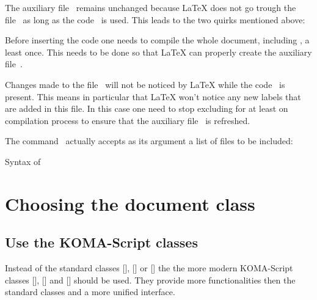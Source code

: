 The auxiliary file~ remains unchanged because {\LaTeX} does not go trough the file~ as long as the code~ is used.
This leads to the two quirks mentioned above:
\begin{myitemize}
  \item
    Before inserting the code  one needs to compile the whole document, including , a least once.
    This needs to be done so that {\LaTeX} can properly create the auxiliary file~.
  \item
    Changes made to the file~ will not be noticed by {\LaTeX} while the code~ is present.
    This means in particular that {\LaTeX} won’t notice any new labels that are added in this file.
    In this case one need to stop excluding  for at least on compilation process to ensure that the auxiliary file~ is refreshed.
\end{myitemize}

The command~ actually accepts as its argument a list of files to be included:
\begin{showcode}{Syntax of }
  
\end{showcode}





\section{Choosing the document class}



\subsection{Use the KOMA-Script classes}

Instead of the standard classes [\optname], [\optname] or [\optname] the the more modern KOMA-Script classes [\optname], [\optname] and [\optname] should be used.
They provide more functionalities then the standard classes and a more unified interface.

